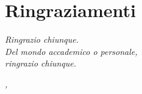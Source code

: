 
\cleardoublepage
{}
{}

\medskip

\bigskip

\begingroup
\let\clearpage\relax
\let\cleardoublepage\relax
\let\cleardoublepage\relax

\chapter*{Ringraziamenti}

\noindent \textit{Ringrazio chiunque.}\\
\noindent \textit{Del mondo accademico o personale,}\\
\noindent \textit{ringrazio chiunque.}\\

\bigskip

\noindent\textit{\myLocation, \myTime}
\hfill \myName

\endgroup


